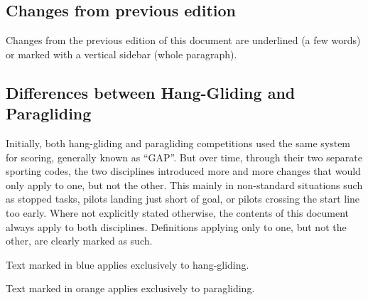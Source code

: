 \documentclass[../gap.tex]{civl}
\begin{document}
\subsection{Changes from previous edition}
Changes from the previous edition of this document are underlined (a few words)
or marked with a vertical sidebar (whole paragraph).

\subsection{Differences between Hang-Gliding and Paragliding}
Initially, both hang-gliding and paragliding competitions used the same system
for scoring, generally known as “GAP”. But over time, through their two
separate sporting codes, the two disciplines introduced more and more changes
that would only apply to one, but not the other. This mainly in non-standard
situations such as stopped tasks, pilots landing just short of goal, or pilots
crossing the start line too early. Where not explicitly stated otherwise, the
contents of this document always apply to both disciplines. Definitions
applying only to one, but not the other, are clearly marked as such.

\begin{hg}
Text marked in blue applies exclusively to hang-gliding.
\end{hg}

\begin{pg}
Text marked in orange applies exclusively to paragliding.
\end{pg}
\end{document}
